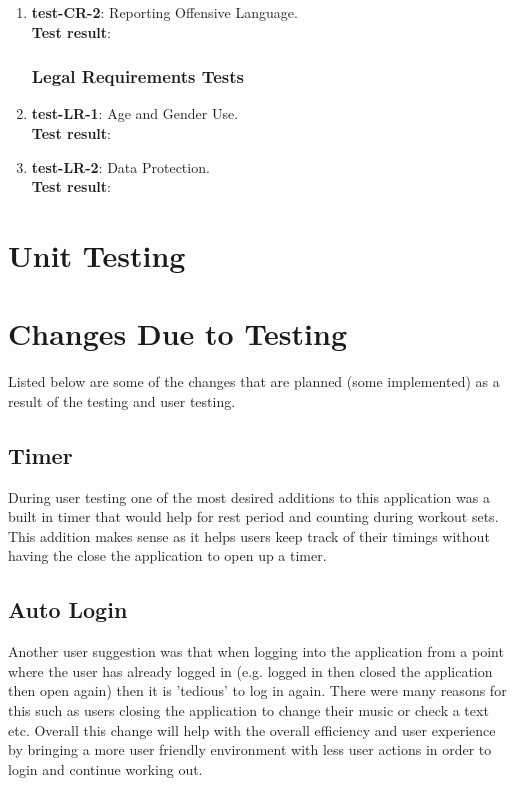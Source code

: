 \documentclass[12pt, titlepage]{article}
\begin{document}
\begin{enumerate}
	\item{\textbf{test-CR-2}}: Reporting Offensive Language.\\
	\textbf{Test result}:
	
\subsubsection{Legal Requirements Tests}
	\item{\textbf{test-LR-1}}: Age and Gender Use.\\
	\textbf{Test result}:
	
	\item{\textbf{test-LR-2}}: Data Protection.\\
	\textbf{Test result}:
	
\end{enumerate}
	
%

\section{Unit Testing}

\section{Changes Due to Testing}
Listed below are some of the changes that are planned (some implemented) as a result of the testing and user testing.
\subsection{Timer}
During user testing one of the most desired additions to this application was a built in timer that would help for rest period and counting during workout sets. This addition makes sense as it helps users keep track of their timings without having the close the application to open up a timer. 
\subsection{Auto Login}
Another user suggestion was that when logging into the application from a point where the user has already logged in (e.g. logged in then closed the application then open again) then it is 'tedious' to log in again. There were many reasons for this such as users closing the application to change their music or check a text etc. Overall this change will help with the overall efficiency and user experience by bringing a more user friendly environment with less user actions in order to login and continue working out.
\end{document}
